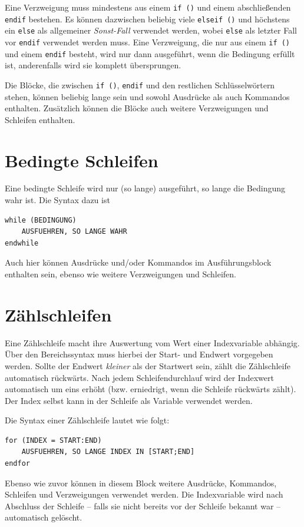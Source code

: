 \documentclass[DIV=14,headsepline,footsepline]{scrbook}
\begin{document}
				Eine Verzweigung muss mindestens aus einem \lstinline+if ()+ und einem abschließenden \lstinline+endif+ bestehen. Es können dazwischen beliebig viele \lstinline+elseif ()+ und höchstens ein \lstinline+else+ als allgemeiner \emph{Sonst-Fall} verwendet werden, wobei \lstinline+else+ als letzter Fall vor \lstinline+endif+ verwendet werden muss. Eine Verzweigung, die nur aus einem \lstinline+if ()+ und einem \lstinline+endif+ besteht, wird nur dann ausgeführt, wenn die Bedingung erfüllt ist, anderenfalls wird sie komplett übersprungen.
				
				Die Blöcke, die zwischen \lstinline+if ()+, \lstinline+endif+ und den restlichen Schlüsselwörtern stehen, können beliebig lange sein und sowohl Ausdrücke als auch Kommandos enthalten. Zusätzlich können die Blöcke auch weitere Verzweigungen und Schleifen enthalten.
				
			\section{Bedingte Schleifen}
				Eine bedingte Schleife wird nur (so lange) ausgeführt, so lange die Bedingung wahr ist. Die Syntax dazu ist
				\begin{lstlisting}
while (BEDINGUNG)
	AUSFUEHREN, SO LANGE WAHR
endwhile
				\end{lstlisting}
				Auch hier können Ausdrücke und/oder Kommandos im Ausführungsblock enthalten sein, ebenso wie weitere Verzweigungen und Schleifen.
				
			\section{Zählschleifen}
				Eine Zählschleife macht ihre Auswertung vom Wert einer Indexvariable abhängig. Über den Bereichssyntax muss hierbei der Start- und Endwert vorgegeben werden. Sollte der Endwert \emph{kleiner} als der Startwert sein, zählt die Zählschleife automatisch rückwärts. Nach jedem Schleifendurchlauf wird der Indexwert automatisch um eins erhöht (bzw. erniedrigt, wenn die Schleife rückwärts zählt). Der Index selbst kann in der Schleife als Variable verwendet werden.
				
				Die Syntax einer Zählschleife lautet wie folgt:
				\begin{lstlisting}
for (INDEX = START:END)
	AUSFUEHREN, SO LANGE INDEX IN [START;END]
endfor
				\end{lstlisting}
				Ebenso wie zuvor können in diesem Block weitere Ausdrücke, Kommandos, Schleifen und Verzweigungen verwendet werden. Die Indexvariable wird nach Abschluss der Schleife -- falls sie nicht bereits vor der Schleife bekannt war -- automatisch gelöscht.
				
\end{document}
